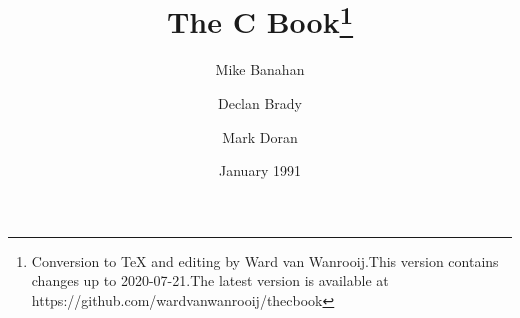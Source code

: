 \documentclass[12pt,twoside,a4paper]{book}
\begin{document}
\frontmatter
\title{The C Book\thanks{Conversion to TeX and editing by Ward van Wanrooij.\newline This version contains changes up to 2020-07-21.\newline The latest version is available at https://github.com/wardvanwanrooij/thecbook}}
\author{Mike Banahan \and Declan Brady \and Mark Doran}
\date{January 1991}
\maketitle
{}
\newpage
{}
\setcounter{page}{1}
\tableofcontents
\mainmatter




{}
\end{document}
